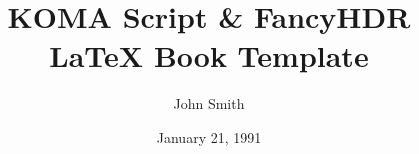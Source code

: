 \documentclass[a4paper,11pt]{scrbook}
\begin{document}
\title{\textbf{KOMA Script \& FancyHDR LaTeX Book Template}}
\author{John Smith}
\date{January 21, 1991}



\maketitle






\tableofcontents



\pagestyle{fancy}
\renewcommand*{\chaptermark}[1]{\markboth{\thechapter.~~#1}{}}
\renewcommand*{\sectionmark}[1]{\markright{\thesection.~~#1}}







\nocite{*}



\end{document}
